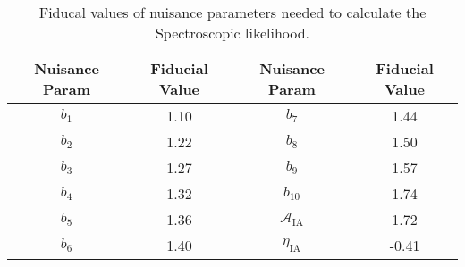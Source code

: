 \documentclass[../main.tex]{subfiles}
\begin{document}
\begin{table}
    \centering
    \begin{tabular}{c|c||c|c}
        \hline
        \rowcolor{cyan}Nuisance Param &Fiducial Value&Nuisance Param &Fiducial Value\\
    \hline
    $b_1$ & 1.10 & $b_7$ & 1.44\\  
    $b_2$ & 1.22 & $b_8$ & 1.50\\  
    $b_3$ & 1.27 & $b_9$ & 1.57\\  
    $b_4$ & 1.32 & $b_{10}$ & 1.74\\  
    $b_5$ & 1.36 & $\mathcal{A}_\mathrm{IA}$ & 1.72\\  
    $b_6$ & 1.40 & $\eta_\mathrm{IA}$ & -0.41\\  

\end{tabular}
\caption{Fiducal values of nuisance parameters needed to calculate the Spectroscopic likelihood.}
\label{tab:spectro_nuisance}
\end{table}
\end{document}
